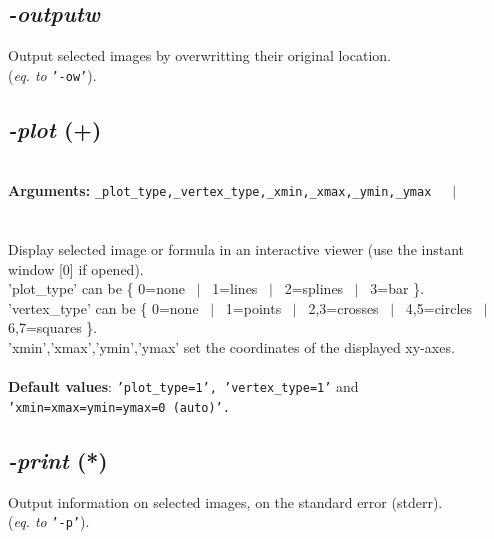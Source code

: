 \documentclass[a4paper,11pt,twoside]{book}
\begin{document}
\subsection{\emph{-outputw} }\vspace*{-0.5em}
Output selected images by overwritting their original location.
~\\(\emph{eq. to} {\small \texttt{'-ow'}}).


\subsection{\emph{-plot} (+)}\vspace*{-0.5em}
~\\\textbf{Arguments: } 
{\small \texttt{\_plot\_type,\_vertex\_type,\_xmin,\_xmax,\_ymin,\_ymax}}~~~$|$\\
\\~\\
Display selected image or formula in an interactive viewer (use the instant window [0] if opened).
~\\'plot\_type' can be \{ 0=none ~$|$~ 1=lines ~$|$~ 2=splines ~$|$~ 3=bar \}.
~\\'vertex\_type' can be \{ 0=none ~$|$~ 1=points ~$|$~ 2,3=crosses ~$|$~ 4,5=circles ~$|$~ 6,7=squares \}.
~\\'xmin','xmax','ymin','ymax' set the coordinates of the displayed xy-axes.
~\\~\\\textbf{Default values}: {\small \texttt{'plot\_type=1', 'vertex\_type=1'} and \texttt{'xmin=xmax=ymin=ymax=0 (auto)'.}}


\subsection{\emph{-print} (*)}\vspace*{-0.5em}
Output information on selected images, on the standard error (stderr).
~\\(\emph{eq. to} {\small \texttt{'-p'}}).
\end{document}
